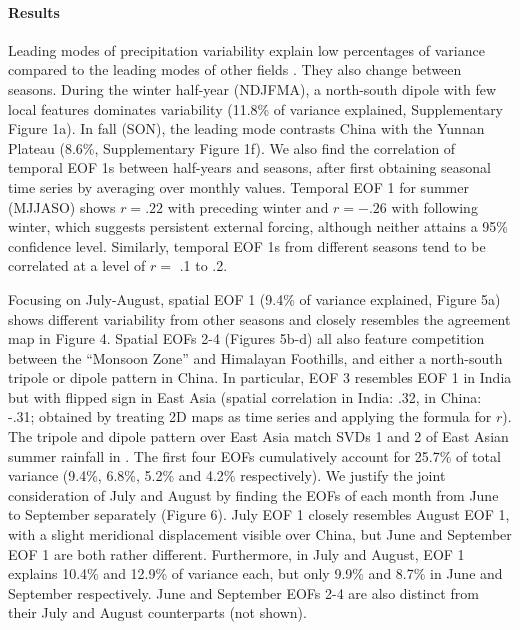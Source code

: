 \documentclass[12pt]{article}
\begin{document}
\paragraph{Results}	
	
	Leading modes of precipitation variability explain low percentages of variance compared to the leading modes of other fields \citep{Dai1997}. They also change between seasons. During the winter half-year (NDJFMA), a north-south dipole with few local features dominates variability (11.8\% of variance explained, Supplementary Figure 1a). In fall (SON), the leading mode contrasts China with the Yunnan Plateau (8.6\%, Supplementary Figure 1f). We also find the correlation of temporal EOF 1s between half-years and seasons, after first obtaining seasonal time series by averaging over monthly values. Temporal EOF 1 for summer (MJJASO) shows $r=.22$  with preceding winter and $r=-.26$ with following winter, which suggests persistent external forcing, although neither attains a 95\% confidence level. Similarly, temporal EOF 1s from different seasons tend to be correlated at a level of $r=$ .1 to .2.

	Focusing on July-August, spatial EOF 1 (9.4\% of variance explained, Figure 5a) shows different variability from other seasons and closely resembles the agreement map in Figure 4. Spatial EOFs 2-4 (Figures 5b-d) all also feature competition between the ``Monsoon Zone'' and Himalayan Foothills, and either a north-south tripole or dipole pattern in China. In particular, EOF 3 resembles EOF 1 in India but with flipped sign in East Asia (spatial correlation in India: .32, in China: -.31; obtained by treating 2D maps as time series and applying the formula for $r$). The tripole and dipole pattern over East Asia match SVDs 1 and 2 of East Asian summer rainfall in \cite{Kosaka2011}. The first four EOFs cumulatively account for 25.7\% of total variance (9.4\%, 6.8\%, 5.2\% and 4.2\% respectively). We justify the joint consideration of July and August by finding the EOFs of each month from June to September separately (Figure 6). July EOF 1 closely resembles August EOF 1, with a slight meridional displacement visible over China, but June and September EOF 1 are both rather different. Furthermore, in July and August, EOF 1 explains 10.4\% and 12.9\% of variance each, but only 9.9\% and 8.7\% in June and September respectively. June and September EOFs 2-4 are also distinct from their July and August counterparts (not shown). 
\end{document}
